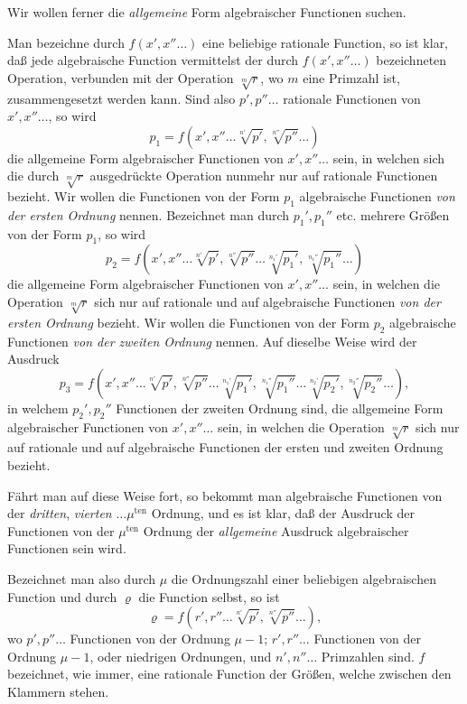 \documentclass{article}
\begin{document}
Wir wollen ferner die \emph{allgemeine} Form algebraischer Functionen suchen.

Man bezeichne durch $f(x', x'' \ldots)$ eine beliebige rationale Function, so ist klar, daß jede algebraische Function vermittelst der durch $f(x', x'' \ldots)$ bezeichneten Operation, verbunden mit der Operation $\sqrt[m]{r}$, wo $m$ eine Primzahl ist, zusammengesetzt werden kann. Sind also $p', p'' \ldots$ rationale Functionen von $x', x'' \ldots$, so wird
\[ p_1 = f(x', x'' \ldots \sqrt[n']{p'}, \sqrt[n'']{p''} \ldots) \]
die allgemeine Form algebraischer Functionen von $x', x'' \ldots$ sein, in welchen sich die durch $\sqrt[m]{r}$ ausgedrückte Operation nunmehr nur auf rationale Functionen bezieht. Wir wollen die Functionen von der Form $p_1$ algebraische Functionen \emph{von der ersten Ordnung} nennen. Bezeichnet man durch $p_1', p_1'' $ etc. mehrere Größen von der Form $p_1$, so wird
\[ p_2 = f(x', x'' \ldots \sqrt[n']{p'}, \sqrt[n'']{p''} \ldots \sqrt[n_1']{p_1'}, \sqrt[n_1'']{p_1''} \ldots) \]
die allgemeine Form algebraischer Functionen von $x', x'' \ldots$ sein, in welchen die Operation $\sqrt[m]{r}$ sich nur auf rationale und auf algebraische Functionen \emph{von der ersten Ordnung} bezieht. Wir wollen die Functionen von der Form $p_2$ algebraische Functionen \emph{von der zweiten Ordnung} nennen. Auf dieselbe Weise wird der Ausdruck
\[ p_3 = f(x', x'' \ldots \sqrt[n']{p'}, \sqrt[n'']{p''} \ldots \sqrt[n_1']{p_1'}, \sqrt[n_1'']{p_1''} \ldots \sqrt[n_2']{p_2'}, \sqrt[n_2'']{p_2''} \ldots), \]
in welchem $p_2', p_2''$ Functionen der zweiten Ordnung sind, die allgemeine Form algebraischer Functionen von $x', x'' \ldots$ sein, in welchen die Operation $\sqrt[m]{r}$ sich nur auf rationale und auf algebraische Functionen der ersten und zweiten Ordnung bezieht.

Fährt man auf diese Weise fort, so bekommt man algebraische Functionen von der \emph{dritten}, \emph{vierten} $\ldots \mu^{\text{ten}}$ Ordnung, und es ist klar, daß der Ausdruck der Functionen von der $\mu^{\text{ten}}$ Ordnung der \emph{allgemeine} Ausdruck algebraischer Functionen sein wird.

Bezeichnet man also durch $\mu$ die Ordnungszahl einer beliebigen algebraischen Function und durch $\varrho$ die Function selbst, so ist
\[ \varrho = f(r', r'' \ldots \sqrt[n']{p'}, \sqrt[n'']{p''} \ldots), \]
wo $p', p'' \ldots$ Functionen von der Ordnung $\mu - 1$; $r', r'' \ldots$ Functionen von der Ordnung $\mu - 1$, oder niedrigen Ordnungen, und $n', n'' \ldots$ Primzahlen sind. $f$ bezeichnet, wie immer, eine rationale Function der Größen, welche zwischen den Klammern stehen.
\end{document}

